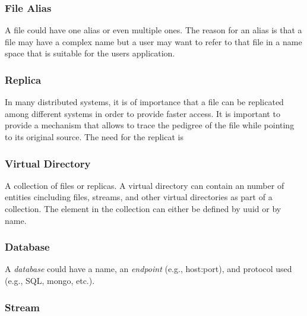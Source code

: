 \documentclass[10pt]{article}
\begin{document}

\subsubsection{File Alias}

A file could have one alias or even multiple ones. The reason for an
alias is that a file may have a complex name but a user may want to
refer to that file in a name space that is suitable for the users
application.


\subsubsection{Replica}

In many distributed systems, it is of importance that a file can be
replicated among different systems in order to provide faster
access. It is important to provide a mechanism that allows to trace
the pedigree of the file while pointing to its original source. The need for the replicat is  




\subsubsection{Virtual Directory}

A collection of files or replicas. A virtual directory can contain an
number of entities cincluding files, streams, and other virtual
directories as part of a collection. The element in the collection can
either be defined by uuid or by name. 


\subsubsection{Database}

A \textit{database} could have a name, an \textit{endpoint} (e.g., host:port),
and protocol used (e.g., SQL, mongo, etc.).


\subsubsection{Stream} 
\end{document}
